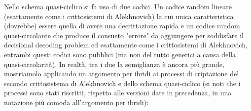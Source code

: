 \documentclass[12pt, a4paper]{report}
\theoremstyle{definition}
\begin{document}
			Nello schema quasi-ciclico si fa uso di due codici. Un codice random lineare (esattamente come i crittosistemi di Alekhnovich) la cui unica caratteristica (dovrebbe) essere quella di avere una decrittazione rapida e un codice random quasi-circolante che produce il consueto "errore" da aggiungere per soddisfare il decisional decoding problem ed esattamente come i crittosistemi di Alekhnovich, entrambi questi codici sono pubblici (ma non del tutto generici a causa della quasi-circolarità). In realtà, tra i due la somiglianza è ancora più grande, mostriamolo applicando un argomento per ibridi ai processi di criptazione del secondo crittosistema di Alekhnovich e dello schema quasi-ciclico (si noti che i processi sono stati riscritti, rispetto alle versioni date in precedenza, in una notazione più comoda all'argomento per ibridi):
			
\end{document}
